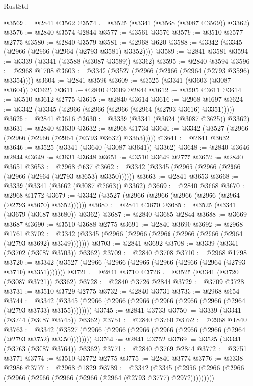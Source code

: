 \begin{lexlean}{RustStd}
\begin{coremodule}
@3569 := @2841 @3562
@3574 := @3525 (@3341 (@3568 (@3087 @3569)) @3362)
@3576 := @2840 @3574 @2844
@3577 := @3561 @3576
@3579 := @3510 @3577 @2775
@3580 := @2840 @3579
@3581 := @2968 @620
@3588 := @3342 (@3345 (@2966 (@2966 (@2964 (@2793 @3581) @3352))))
@3589 := @2841 @3581
@3594 := @3339 (@3341 (@3588 (@3087 @3589)) @3362)
@3595 := @2840 @3594
@3596 := @2968 @1708
@3603 := @3342 (@3527 (@2966 (@2966 (@2964 (@2793 @3596) @3354))))
@3604 := @2841 @3596
@3609 := @3525 (@3341 (@3603 (@3087 @3604)) @3362)
@3611 := @2840 @3609 @2844
@3612 := @3595 @3611
@3614 := @3510 @3612 @2775
@3615 := @2840 @3614
@3616 := @2968 @1697
@3624 := @3342 (@3345 (@2966 (@2966 (@2966 (@2964 (@2793 @3616) @3351)))))
@3625 := @2841 @3616
@3630 := @3339 (@3341 (@3624 (@3087 @3625)) @3362)
@3631 := @2840 @3630
@3632 := @2968 @1734
@3640 := @3342 (@3527 (@2966 (@2966 (@2966 (@2964 (@2793 @3632) @3353)))))
@3641 := @2841 @3632
@3646 := @3525 (@3341 (@3640 (@3087 @3641)) @3362)
@3648 := @2840 @3646 @2844
@3649 := @3631 @3648
@3651 := @3510 @3649 @2775
@3652 := @2840 @3651
@3653 := @2968 @637
@3662 := @3342 (@3345 (@2966 (@2966 (@2966 (@2966 (@2964 (@2793 @3653) @3350))))))
@3663 := @2841 @3653
@3668 := @3339 (@3341 (@3662 (@3087 @3663)) @3362)
@3669 := @2840 @3668
@3670 := @2968 @1772
@3679 := @3342 (@3527 (@2966 (@2966 (@2966 (@2966 (@2964 (@2793 @3670) @3352))))))
@3680 := @2841 @3670
@3685 := @3525 (@3341 (@3679 (@3087 @3680)) @3362)
@3687 := @2840 @3685 @2844
@3688 := @3669 @3687
@3690 := @3510 @3688 @2775
@3691 := @2840 @3690
@3692 := @2968 @1761
@3702 := @3342 (@3345 (@2966 (@2966 (@2966 (@2966 (@2966 (@2964 (@2793 @3692) @3349)))))))
@3703 := @2841 @3692
@3708 := @3339 (@3341 (@3702 (@3087 @3703)) @3362)
@3709 := @2840 @3708
@3710 := @2968 @1798
@3720 := @3342 (@3527 (@2966 (@2966 (@2966 (@2966 (@2966 (@2964 (@2793 @3710) @3351)))))))
@3721 := @2841 @3710
@3726 := @3525 (@3341 (@3720 (@3087 @3721)) @3362)
@3728 := @2840 @3726 @2844
@3729 := @3709 @3728
@3731 := @3510 @3729 @2775
@3732 := @2840 @3731
@3733 := @2968 @654
@3744 := @3342 (@3345 (@2966 (@2966 (@2966 (@2966 (@2966 (@2966 (@2964 (@2793 @3733) @3155))))))))
@3745 := @2841 @3733
@3750 := @3339 (@3341 (@3744 (@3087 @3745)) @3362)
@3751 := @2840 @3750
@3752 := @2968 @1840
@3763 := @3342 (@3527 (@2966 (@2966 (@2966 (@2966 (@2966 (@2966 (@2964 (@2793 @3752) @3350))))))))
@3764 := @2841 @3752
@3769 := @3525 (@3341 (@3763 (@3087 @3764)) @3362)
@3771 := @2840 @3769 @2844
@3772 := @3751 @3771
@3774 := @3510 @3772 @2775
@3775 := @2840 @3774
@3776 := @3338 @2986
@3777 := @2968 @1829
@3789 := @3342
    (@3345 (@2966 (@2966 (@2966 (@2966 (@2966 (@2966 (@2966 (@2964 (@2793 @3777) @2972)))))))))

\end{coremodule}
\end{lexlean}

